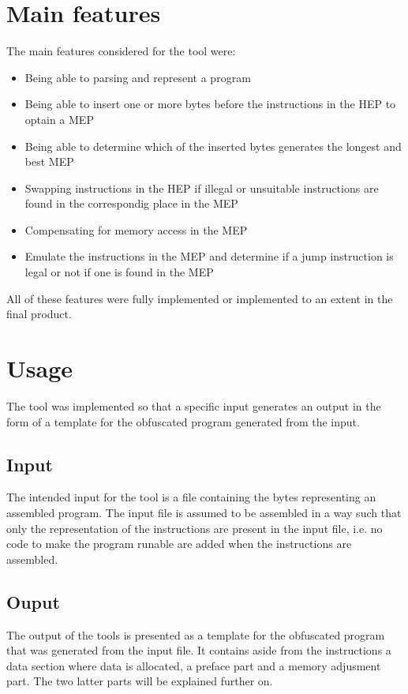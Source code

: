 \documentclass[11pt,twoside]{eitExjobb}
\begin{document}
\section{Main features}
The main features considered for the tool were:

\begin{itemize}
\item{Being able to parsing and represent a program}
\item{Being able to insert one or more bytes before the instructions in the HEP to optain a MEP}
\item{Being able to determine which of the inserted bytes generates the longest and best MEP}
\item{Swapping instructions in the HEP if illegal or unsuitable instructions are found in the correspondig place in the MEP}
\item{Compensating for memory access in the MEP}
\item{Emulate the instructions in the MEP and determine if a jump instruction is legal or not if one is found in the MEP}
\end{itemize}

\noindent All of these features were fully implemented or implemented to an extent in the final product. 

\section{Usage}
The tool was implemented so that a specific input generates an output in the form of a template for the obfuscated program generated from the input.  

\subsection{Input}
The intended input for the tool is a file containing the bytes representing an assembled program. The input file is assumed to be assembled in a way such that only the representation of the instructions are present in the input file, i.e. no code to make the program runable are added when the instructions are assembled.

\subsection{Ouput}
The output of the tools is presented as a template for the obfuscated program that was generated from the input file. It contains aside from the instructions a data section where data is allocated, a preface part and a memory adjusment part. The two latter parts will be explained further on.
\end{document}
